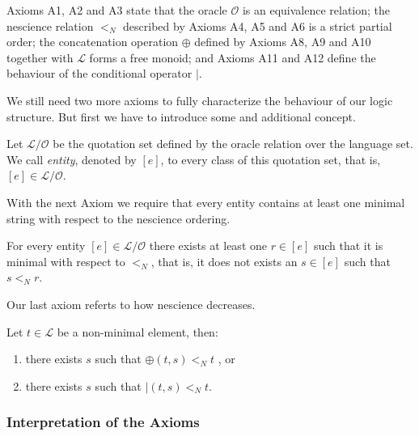 Axioms A1, A2 and A3 state that the oracle $\mathcal{O}$ is an equivalence relation; the nescience relation $<_N$ described by Axioms A4, A5 and A6 is a strict partial order; the concatenation operation $\oplus$ defined by Axioms A8, A9 and A10 together with $\mathcal{L}$ forms a free monoid; and Axioms A11 and A12 define the behaviour of the conditional operator $\mid$. 

We still need two more axioms to fully characterize the behaviour of our logic structure. But first we have to introduce some and additional concept.

\begin{definition}
Let $\mathcal{L} / \mathcal{O}$ be the quotation set defined by the oracle relation over the language set. We call \emph{entity}, denoted by $[e]$, to every class of this quotation set, that is, $[e] \in \mathcal{L} / \mathcal{O}$.
\end{definition}

With the next Axiom we require that every entity contains at least one minimal string with respect to the nescience ordering.

\begin{definition}[Axiom A13]
For every entity $[e] \in \mathcal{L} / \mathcal{O}$ there exists at least one $r \in [e]$ such that it is minimal with respect to $<_N$, that is, it does not exists an $s \in [e]$ such that $s <_N r$.
\end{definition}

Our last axiom referts to how nescience decreases.

\begin{definition}[Axiom A14]
Let $t \in \mathcal{L}$ be a non-minimal element, then:
\begin{enumerate}[label=(\roman*)]
 \item there exists $s$ such that $\oplus \left(t, s \right) <_N t$ , or
 \item there exists $s$ such that $\mid \left(t, s \right) <_N t$.
\end{enumerate}
\end{definition}


\subsubsection*{Interpretation of the Axioms}

